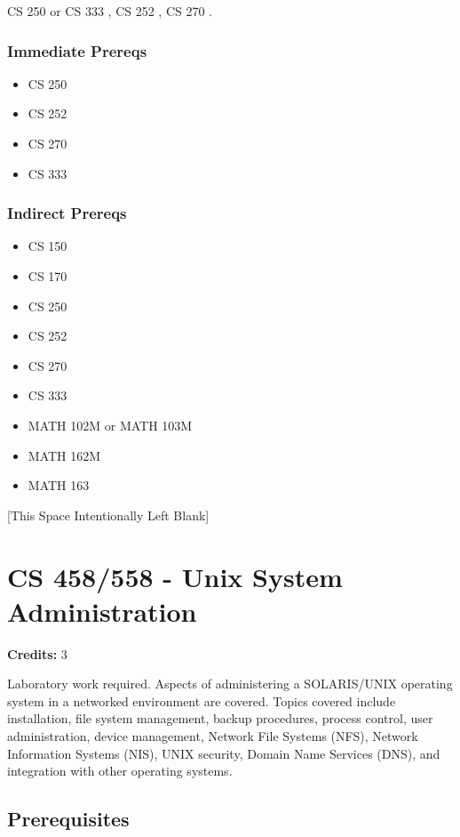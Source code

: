 \documentclass[]{article}
\providecommand{\tightlist}{%
  \setlength{\itemsep}{0pt}\setlength{\parskip}{0pt}}
\newcommand{\pagebreakhere}{
\vspace*{\fill}
\begin{center}
[This Space Intentionally Left Blank]
\end{center}
\vspace*{\fill}
\newpage
}
\begin{document}
CS 250 or CS 333 , CS 252 , CS 270 .

\subsubsection{Immediate Prereqs}\label{immediate-prereqs-28}

\begin{itemize}
\tightlist
\item
  CS 250
\item
  CS 252
\item
  CS 270
\item
  CS 333
\end{itemize}

\subsubsection{Indirect Prereqs}\label{indirect-prereqs-28}

\begin{itemize}
\tightlist
\item
  CS 150
\item
  CS 170
\item
  CS 250
\item
  CS 252
\item
  CS 270
\item
  CS 333
\item
  MATH 102M or MATH 103M
\item
  MATH 162M
\item
  MATH 163
\end{itemize}

\pagebreakhere
\section{CS 458/558 - Unix System
Administration}\label{cs-458558---unix-system-administration}

\textbf{Credits:} 3

Laboratory work required. Aspects of administering a SOLARIS/UNIX
operating system in a networked environment are covered. Topics covered
include installation, file system management, backup procedures, process
control, user administration, device management, Network File Systems
(NFS), Network Information Systems (NIS), UNIX security, Domain Name
Services (DNS), and integration with other operating systems.

\subsection{Prerequisites}\label{prerequisites-37}
\end{document}
